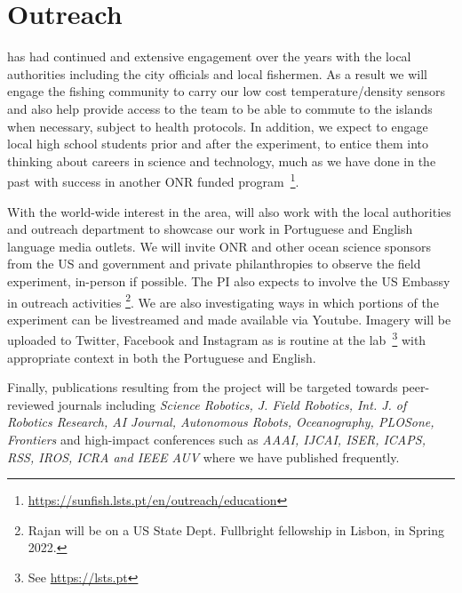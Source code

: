 \section{Outreach}

\inst has had continued and extensive engagement over the years with the
local authorities including the \naz city officials and local fishermen.
As a result we will engage the fishing community to carry our low cost
temperature/density sensors and also help provide access to the team to
be able to commute to the islands when necessary, subject to health
protocols. In addition, we expect to engage local high school students
prior and after the experiment, to entice them into thinking about
careers in science and technology, much as we have done in the past with
success in another ONR funded
program~\footnote{\url{https://sunfish.lsts.pt/en/outreach/education}}.

With the world-wide interest in the \naz area, \proj will also work
with the local authorities and \univ outreach department to showcase
our work in Portuguese and English language media outlets. We will
invite ONR and other ocean science sponsors from the US and government
and private philanthropies to observe the field experiment, in-person
if possible. The PI also expects to involve the US Embassy in outreach
activities \footnote{Rajan will be on a US State Dept. Fullbright
  fellowship in Lisbon, in Spring 2022.}. We are also investigating
ways in which portions of the experiment can be livestreamed and made
available via Youtube. Imagery will be uploaded to Twitter, Facebook
and Instagram as is routine at the \ls lab~\footnote{See
  \url{https://lsts.pt}} with appropriate context in both the
Portuguese and English.

Finally, publications resulting from the project will be targeted
towards peer-reviewed journals including \emph{Science Robotics,
  J. Field Robotics, Int. J. of Robotics Research, AI Journal,
  Autonomous Robots, Oceanography, PLOSone, Frontiers} and high-impact
conferences such as \emph{AAAI, IJCAI, ISER, ICAPS, RSS, IROS, ICRA
  and IEEE AUV} where we have published frequently.

